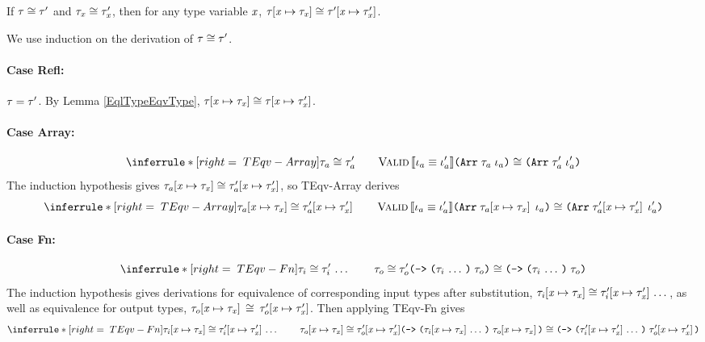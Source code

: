 \begin{theorem}
  \label{EqvTypeEqvType}
  If $\mathit{\tau} \cong \mathit{\tau}'$ and $\mathit{\tau}_{\mathit{x}} \cong \mathit{\tau}_{\mathit{x}}'$,
  then for any type variable $\mathit{x}$,
  $\mathit{\tau}\hspace{-2pt}\left[ \mathit{x} \mapsto \mathit{\tau}_{\mathit{x}} \right] \cong \mathit{\tau}'\hspace{-2pt}\left[ \mathit{x} \mapsto \mathit{\tau}_{\mathit{x}}' \right]$.
\end{theorem}
\begin{sproof}
  We use induction on the derivation of $\mathit{\tau} \cong \mathit{\tau}'$.
  \paragraph{Case {\sc Refl}:}
  $\mathit{\tau} = \mathit{\tau}'$.
  By Lemma \ref{EqlTypeEqvType},
  $\mathit{\tau}\hspace{-2pt}\left[ \mathit{x} \mapsto \mathit{\tau}_{\mathit{x}} \right] \cong \mathit{\tau}\hspace{-2pt}\left[ \mathit{x} \mapsto \mathit{\tau}_{\mathit{x}}' \right]$.
  \paragraph{Case {\sc Array}:}
  \[\infr[TEqv-Array]
  {\teqv{\type_a}{\type_a'} \qquad \ieqv{\idx_a}{\idx_a'}}
  {\teqv{\typearray{\type_a}{\idx_a}}{\typearray{\type_a'}{\idx_a'}}}\]
  The induction hypothesis gives
  $\mathit{\tau}_a\hspace{-2pt}\left[ \mathit{x} \mapsto \mathit{\tau}_{\mathit{x}} \right] \cong \mathit{\tau}_a'\hspace{-2pt}\left[ \mathit{x} \mapsto \mathit{\tau}_{\mathit{x}}' \right]$,
  so {\sc TEqv-Array} derives
  \[\infr[TEqv-Array]
  {\teqv{\subst{\type_a}{\var}{\type_{\var}}}{\subst{\type_a'}{\var}{\type_{\var}'}}
    \qquad \ieqv{\idx_a}{\idx_a'}}
  {\teqv
    {\typearray{\subst{\type_a}{\var}{\type_{\var}}}{\idx_a}}
    {\typearray{\subst{\type_a'}{\var}{\type_{\var}'}}{\idx_a'}}}\]
  \paragraph{Case {\sc Fn}:}
  \[\infr[TEqv-Fn]
  {\sequence{\teqv{\type_i}{\type_i'}} \qquad \teqv{\type_o}{\type_o'}}
  {\teqv
    {\typefun{\sequence{\type_i}}{\type_o}}
    {\typefun{\sequence{\type_i}}{\type_o}}}\]
  The induction hypothesis gives derivations for
  equivalence of corresponding input types after substitution,
  $\mathit{\tau}_i\hspace{-2pt}\left[ \mathit{x} \mapsto \mathit{\tau}_{\mathit{x}} \right] \cong \mathit{\tau}_i'\hspace{-2pt}\left[ \mathit{x} \mapsto \mathit{\tau}_{\mathit{x}}' \right] \, \ldots \,$,
  as well as equivalence for output types,
  ${\mathit{\tau}_o\hspace{-2pt}\left[ \mathit{x} \mapsto \mathit{\tau}_{\mathit{x}} \right]}$
  ${\cong}$
  ${\mathit{\tau}_o'\hspace{-2pt}\left[ \mathit{x} \mapsto \mathit{\tau}_{\mathit{x}}' \right]}$.
  Then applying {\sc TEqv-Fn} gives
  \[\infr[TEqv-Fn]
  {\sequence{\teqv{\subst{\type_i}{\var}{\type_{\var}}}{\subst{\type_i'}{\var}{\type_{\var}'}}}
    \qquad \teqv{\subst{\type_o}{\var}{\type_{\var}}}{\subst{\type_o'}{\var}{\type_{\var}'}}}
  {\teqv
    {\typefun{\sequence{\subst{\type_i}{\var}{\type_{\var}}}}{\subst{\type_o}{\var}{\type_{\var}}}}
    {\typefun{\sequence{\subst{\type_i'}{\var}{\type_{\var}'}}}{\subst{\type_o'}{\var}{\type_{\var}'}}}}\]

\end{sproof}
